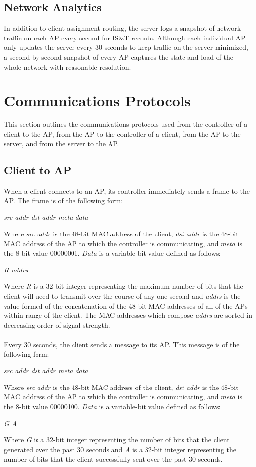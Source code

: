 \documentclass[10pt,journal,compsoc]{IEEEtran}
\begin{document}
		\subsection{Network Analytics}
		In addition to client assignment routing, the server logs a snapshot of network traffic on each AP every second for IS\&T records. Although each individual AP only updates the server every 30 seconds to keep traffic on the server minimized, a second-by-second snapshot of every AP captures the state and load of the whole network with reasonable resolution.
		
		\section{Communications Protocols}
		This section outlines the communications protocols used from the controller of a client to the AP, from the AP to the controller of a client, from the AP to the server, and from the server to the AP.
		
		\subsection{Client to AP}
		When a client connects to an AP, its controller immediately sends a frame to the AP. The frame is of the following form:
		\begin{center}\textit{ src addr \textbar dst addr \textbar meta \textbar data  }\end{center}
		Where \textit{src addr} is the 48-bit MAC address of the client, \textit{dst addr} is the 48-bit MAC address of the AP to which the controller is communicating, and \textit{meta} is the 8-bit value 00000001. \textit{Data} is a variable-bit value defined as follows:
		\begin{center}\textit{R \textbar addrs}\end{center}
		Where \textit{R} is a 32-bit integer representing the maximum number of bits that the client will need to transmit over the course of any one second and \textit{addrs} is the value formed of the concatenation of the 48-bit MAC addresses of all of the APs within range of the client. The MAC addresses which compose \textit{addrs} are sorted in decreasing order of signal strength.\\
		\\
		Every 30 seconds, the client sends a message to its AP. This message is of the following form:
		\begin{center}\textit{ src addr \textbar dst addr \textbar meta \textbar data  }\end{center}
		Where \textit{src addr} is the 48-bit MAC address of the client, \textit{dst addr} is the 48-bit MAC address of the AP to which the controller is communicating, and \textit{meta} is the 8-bit value 00000100. \textit{Data} is a variable-bit value defined as follows:
		\begin{center}\textit{G \textbar A}\end{center}
		Where \textit{G} is a 32-bit integer representing the number of bits that the client generated over the past 30 seconds and \textit{A} is a 32-bit integer representing the number of bits that the client successfully sent over the past 30 seconds.
		
\end{document}
